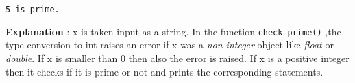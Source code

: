 \documentclass[11pt]{article}
\begin{document}
    \begin{Verbatim}[commandchars=\\\{\}]
5 is prime.
    \end{Verbatim}

    \textbf{Explanation} : x is taken input as a string. In the function
\texttt{check\_prime()} ,the type conversion to int raises an error if x
was a \emph{non integer} object like \emph{float} or \emph{double}. If x
is smaller than 0 then also the error is raised. If x is a positive
integer then it checks if it is prime or not and prints the
corresponding statements.


    
    
    
\end{document}
